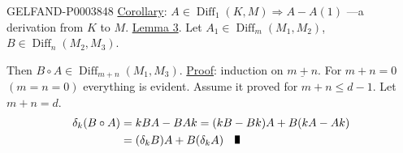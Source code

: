 \begin{GelfandAdjacentEvidence}{GELFAND-P000384}{8}
\underline{Corollary}: $A\in\operatorname{Diff}_1(K, M)\Longrightarrow A-A (1)$ ---a derivation from $K$ to $M$.
\underline{Lemma 3}. Let $A_1\in\operatorname{Diff}_m (M_1, M_2)$, $B\in\operatorname{Diff}_n (M_2, M_3)$.
\end{GelfandAdjacentEvidence}

Then $B\circ A\in\operatorname{Diff}_{m+n}(M_1, M_3)$.
\underline{Proof}: induction on $\underline{m+n}$.
For $m+n=0$$(m=n=0)$ everything is evident.
Assume it proved for $m+n\le d-1$. Let $m+n=d$.
\begin{align*}\delta_k (B\circ A)&=kBA-BAk=(kB-Bk)A+B (kA-Ak)\\&=(\delta_kB)A+B (\delta_kA)\quad\text{\rule{1.5mm}{2.5mm}}\end{align*}






